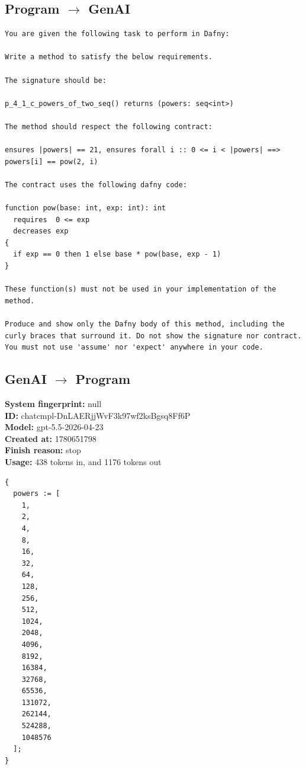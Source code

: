 \documentclass{article}
\begin{document}
\subsection*{Program $\rightarrow$ GenAI}
\begin{lstlisting}
You are given the following task to perform in Dafny:

Write a method to satisfy the below requirements.

The signature should be:

p_4_1_c_powers_of_two_seq() returns (powers: seq<int>)

The method should respect the following contract:

ensures |powers| == 21, ensures forall i :: 0 <= i < |powers| ==> powers[i] == pow(2, i)

The contract uses the following dafny code:

function pow(base: int, exp: int): int
  requires  0 <= exp
  decreases exp
{
  if exp == 0 then 1 else base * pow(base, exp - 1)
}

These function(s) must not be used in your implementation of the method.

Produce and show only the Dafny body of this method, including the curly braces that surround it. Do not show the signature nor contract. You must not use 'assume' nor 'expect' anywhere in your code.
\end{lstlisting}
\subsection*{GenAI $\rightarrow$ Program}
\textbf{System fingerprint: }null
\\\textbf{ID: }chatcmpl-DnLAERjjWvF3k97wf2ksBgsq8Ff6P
\\\textbf{Model: }gpt-5.5-2026-04-23
\\\textbf{Created at: }1780651798
\\\textbf{Finish reason: }stop
\\\textbf{Usage: }438 tokens in, and 1176 tokens out
\begin{lstlisting}
{
  powers := [
    1,
    2,
    4,
    8,
    16,
    32,
    64,
    128,
    256,
    512,
    1024,
    2048,
    4096,
    8192,
    16384,
    32768,
    65536,
    131072,
    262144,
    524288,
    1048576
  ];
}
\end{lstlisting}
\end{document}

